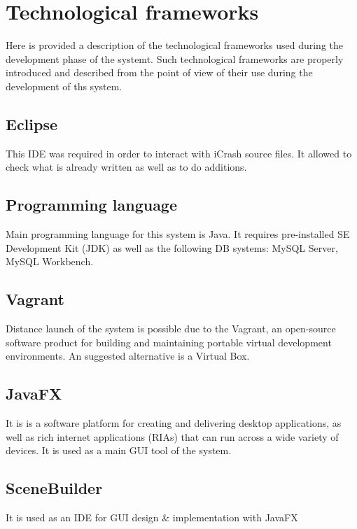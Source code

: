 \chapter{Technological frameworks}
\label{chap:techFrm}


Here is provided a description of the technological frameworks used during the
development phase of the systemt. Such technological frameworks
are properly introduced and described from the point of view of their
use during the development of ths system.



\section{Eclipse}
\label{sec:Eclipse}
This IDE was required in order to interact with iCrash source files. It allowed
to check what is already written as well as to do additions. 


\section{Programming language}
\label{sec:Programming language}
Main programming language for this system is Java. It requires pre-installed SE
Development Kit (JDK) as well as the following DB systems: MySQL Server, MySQL
Workbench. 


\section{Vagrant}
\label{sec:Vagrant}
Distance launch of the system is possible due to the Vagrant, an open-source
software product for building and maintaining portable virtual development
environments. An suggested alternative is a Virtual Box.


\section{JavaFX}
\label{sec:JavaFX}
It is  is a software platform for creating and delivering desktop applications,
as well as rich internet applications (RIAs) that can run across a wide variety
of devices. It is used as a main GUI tool of the system.

\section{SceneBuilder}
\label{sec:SceneBuilder}
It is used as an IDE for GUI design & implementation with JavaFX








